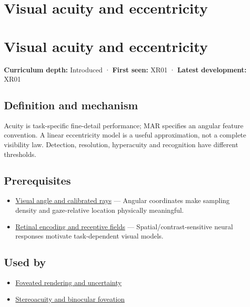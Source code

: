 \hypertarget{appendix-b491fc48c54b}{}
\section*{Visual acuity and eccentricity}
\section{Visual acuity and eccentricity}\label{visual-acuity-and-eccentricity}

\textbf{Curriculum depth:} Introduced · \textbf{First seen:} XR01 · \textbf{Latest development:} XR01

\subsection{Definition and mechanism}\label{definition-and-mechanism}

Acuity is task-specific fine-detail performance; MAR specifies an angular feature convention. A linear eccentricity model is a useful approximation, not a complete visibility law. Detection, resolution, hyperacuity and recognition have different thresholds.

\subsection{Prerequisites}\label{prerequisites}

\begin{itemize}
\tightlist
\item
  \hyperref[appendix-7d356c396d1a]{Visual angle and calibrated rays} --- Angular coordinates make sampling density and gaze-relative location physically meaningful.
\item
  \hyperref[appendix-7281c15ac44a]{Retinal encoding and receptive fields} --- Spatial/contrast-sensitive neural responses motivate task-dependent visual models.
\end{itemize}

\subsection{Used by}\label{used-by}

\begin{itemize}
\tightlist
\item
  \hyperref[appendix-5878b813b732]{Foveated rendering and uncertainty}
\item
  \hyperref[appendix-8dc848f14052]{Stereoacuity and binocular foveation}
\end{itemize}


